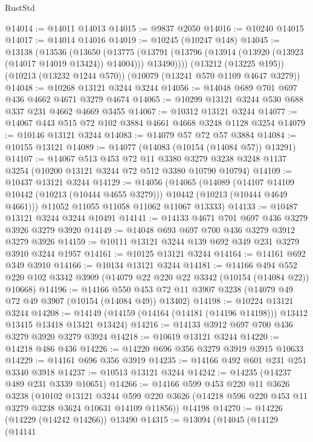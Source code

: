 \begin{lexlean}{RustStd}
\begin{coremodule}
{\begin{coremodule}
{{{{{{{{{{{{{{{{{{{{{{{{{{@14014 := @14011 @14013
@14015 := @9837 @2050
@14016 := @10240 @14015
@14017 := @14014 @14016
@14019 := @10245 (@10247 @148)
@14045 := @13138
    (@13536
      (@13650
        (@13775 (@13791 (@13796 (@13914 (@13920 (@13923 (@14017 @14019 @13424)) @14004))) @13490))))
    (@13212 (@13225 @195))
    (@10213 (@13232 @1244 @570))
    (@10079 (@13241 @570 @1109 @4647 @3279))
@14048 := @10268 @13121 @3244 @3244
@14056 := @14048 @689 @701 @697 @436 @4662 @4671 @3279 @4674
@14065 := @10299 @13121 @3244 @530 @688 @337 @231 @4662 @4669 @3455
@14067 := @10312 @13121 @3244
@14077 := @14067 @443 @515 @72 @102 @3884 @4661 @4668 @3248 @1128 @3254
@14079 := @10146 @13121 @3244
@14083 := @14079 @57 @72 @57 @3884
@14084 := @10155 @13121
@14089 := @14077 (@14083 (@10154 (@14084 @57)) @13291)
@14107 := @14067
    @513
    @453
    @72
    @11
    @3380
    @3279
    @3238
    @3248
    @1137
    @3254
    (@10200 @13121 @3244 @72 @512 @3380 @10790 @10794)
@14109 := @10437 @13121 @3244
@14129 := @14056
    (@14065
      (@14089
        (@14107 @14109 @10442 (@10213 (@10444 @4655 @3279)))
        @10442
        (@10213 (@10444 @4649 @4661)))
      @11052
      @11055
      @11058
      @11062
      @11067
      @13333)
@14133 := @10487 @13121 @3244 @3244 @10491
@14141 := @14133 @4671 @701 @697 @436 @3279 @3926 @3279 @3920
@14149 := @14048 @693 @697 @700 @436 @3279 @3912 @3279 @3926
@14159 := @10111 @13121 @3244 @139 @692 @349 @231 @3279 @3910 @3244 @1957
@14161 := @10125 @13121 @3244
@14164 := @14161 @692 @349 @3910
@14166 := @10134 @13121 @3244
@14181 := @14166
    @494
    @552
    @220
    @102
    @3342
    @3909
    (@14079 @22 @220 @22 @3342 (@10154 (@14084 @22)) @10668)
@14196 := @14166
    @550
    @453
    @72
    @11
    @3907
    @3238
    (@14079 @49 @72 @49 @3907 (@10154 (@14084 @49)) @13402)
@14198 := @10224 @13121 @3244
@14208 := @14149 (@14159 (@14164 (@14181 (@14196 @14198))) @13412 @13415 @13418 @13421 @13424)
@14216 := @14133 @3912 @697 @700 @436 @3279 @3920 @3279 @3924
@14218 := @10619 @13121 @3244
@14220 := @14218 @486 @436
@14226 := @14220 @696 @356 @3279 @3919 @3915 @10633
@14229 := @14161 @696 @356 @3919
@14235 := @14166 @492 @601 @231 @251 @3340 @3918
@14237 := @10513 @13121 @3244
@14242 := @14235 (@14237 @489 @231 @3339 @10651)
@14266 := @14166
    @599
    @453
    @220
    @11
    @3626
    @3238
    (@10102
      @13121
      @3244
      @599
      @220
      @3626
      (@14218 @596 @220 @453 @11 @3279 @3238 @3624 @10631 @14109 @11856))
    @14198
@14270 := @14226 (@14229 (@14242 @14266)) @13490
@14315 := @13094
    (@14045
      (@14129
        (@14141
}}}}}}}}}}}}}}}}}}}}}}}}}}
\end{coremodule}}
\end{coremodule}
\end{lexlean}
